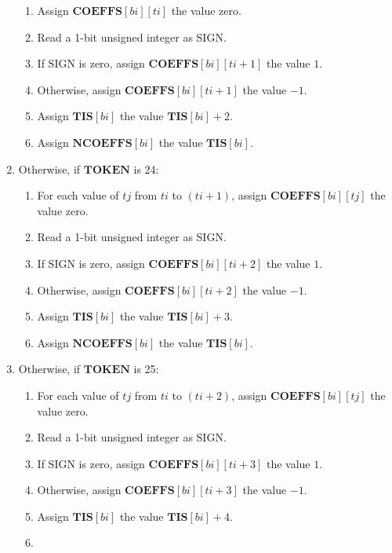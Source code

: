\documentclass[9pt,letterpaper]{book}
\newcommand{\idx}[1]{{\ensuremath{\mathit{#1}}}}
\newcommand{\bi}{\idx{bi}}
\newcommand{\ti}{\idx{ti}}
\newcommand{\tj}{\idx{tj}}
\newcommand{\bitvar}[1]{\ensuremath{\mathbf{\bm{#1}}}}
\newcommand{\locvar}[1]{\ensuremath{\mathrm{#1}}}
\numberwithin{equation}{chapter}
\numberwithin{figure}{chapter}
\numberwithin{table}{chapter}
\begin{document}
\begin{enumerate}
\begin{enumerate}
\item
Assign $\bitvar{COEFFS}[\bitvar{\bi}][\bitvar{\ti}]$ the value zero.
\item
Read a 1-bit unsigned integer as SIGN.
\item
If \locvar{SIGN} is zero, assign
 $\bitvar{COEFFS}[\bitvar{\bi}][\bitvar{\ti}+1]$ the value $1$.
\item
Otherwise, assign $\bitvar{COEFFS}[\bitvar{\bi}][\bitvar{\ti}+1]$ the value
 $-1$.
\item
Assign $\bitvar{TIS}[\bitvar{\bi}]$ the value $\bitvar{TIS}[\bitvar{\bi}]+2$.
\item
Assign $\bitvar{NCOEFFS}[\bitvar{\bi}]$ the value $\bitvar{TIS}[\bitvar{\bi}]$.
\end{enumerate}
\item
Otherwise, if \bitvar{TOKEN} is 24:
\begin{enumerate}
\item
For each value of \locvar{\tj} from \bitvar{\ti} to $(\bitvar{\ti}+1)$, assign
 $\bitvar{COEFFS}[\bitvar{\bi}][\locvar{\tj}]$ the value zero.
\item
Read a 1-bit unsigned integer as SIGN.
\item
If \locvar{SIGN} is zero, assign
 $\bitvar{COEFFS}[\bitvar{\bi}][\bitvar{\ti}+2]$ the value $1$.
\item
Otherwise, assign $\bitvar{COEFFS}[\bitvar{\bi}][\bitvar{\ti}+2]$ the value
 $-1$.
\item
Assign $\bitvar{TIS}[\bitvar{\bi}]$ the value $\bitvar{TIS}[\bitvar{\bi}]+3$.
\item
Assign $\bitvar{NCOEFFS}[\bitvar{\bi}]$ the value $\bitvar{TIS}[\bitvar{\bi}]$.
\end{enumerate}
\item
Otherwise, if \bitvar{TOKEN} is 25:
\begin{enumerate}
\item
For each value of \locvar{\tj} from \bitvar{\ti} to $(\bitvar{\ti}+2)$, assign
 $\bitvar{COEFFS}[\bitvar{\bi}][\locvar{\tj}]$ the value zero.
\item
Read a 1-bit unsigned integer as SIGN.
\item
If \locvar{SIGN} is zero, assign
 $\bitvar{COEFFS}[\bitvar{\bi}][\bitvar{\ti}+3]$ the value $1$.
\item
Otherwise, assign $\bitvar{COEFFS}[\bitvar{\bi}][\bitvar{\ti}+3]$ the value
 $-1$.
\item
Assign $\bitvar{TIS}[\bitvar{\bi}]$ the value $\bitvar{TIS}[\bitvar{\bi}]+4$.
\item

\end{enumerate}
\end{enumerate}
\end{document}
